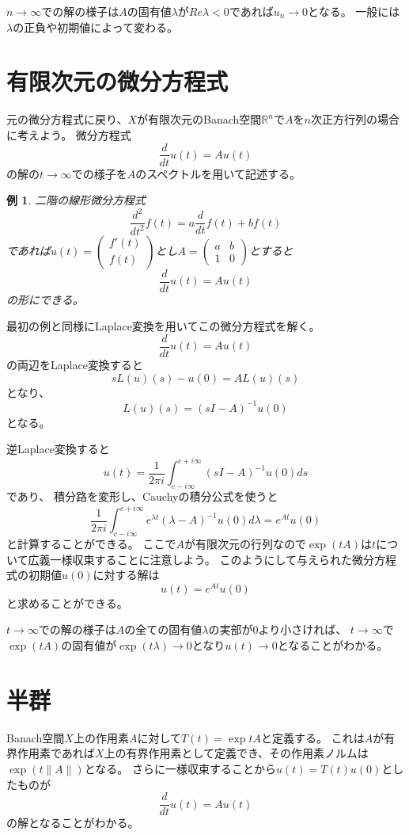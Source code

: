 \documentclass{jsarticle}
\newtheorem{eg}{例}
\newcommand{\R}{\mathbb{R}}
\newcommand{\norm}[1]{\|#1\|}
\begin{document}
$n\to\infty$での解の様子は$A$の固有値$\lambda$が$Re \lambda<0$であれば$u_n\to0$となる。
一般には$\lambda$の正負や初期値によって変わる。

\section{有限次元の微分方程式}
元の微分方程式に戻り、$X$が有限次元のBanach空間$\R^n$で$A$を$n$次正方行列の場合に考えよう。
微分方程式
\[
\frac{d}{dt}u(t)=Au(t)
\]
の解の$t\to\infty$での様子を$A$のスペクトルを用いて記述する。

\begin{eg}二階の線形微分方程式
\[
\frac{d^2}{dt^2}f(t)=a\frac{d}{dt}f(t)+bf(t)
\]
であれば$u(t)=\begin{pmatrix}f'(t)\\f(t)\end{pmatrix}$とし$A=\begin{pmatrix}a&b\\1&0\end{pmatrix}$とすると
\[
\frac{d}{dt}u(t)=Au(t)
\]
の形にできる。
\end{eg}

最初の例と同様にLaplace変換を用いてこの微分方程式を解く。
\[
\frac{d}{dt}u(t)=Au(t)
\]
の両辺をLaplace変換すると
\[
sL(u)(s)-u(0)=AL(u)(s)
\]
となり、
\[
L(u)(s)=(sI-A)^{-1}u(0)
\]
となる。

逆Laplace変換すると
\[
u(t)=\frac{1}{2\pi i}\int^{c+i\infty}_{c-i\infty}(sI-A)^{-1}u(0)ds
\]
であり、
積分路を変形し、Cauchyの積分公式を使うと
\[
\frac{1}{2\pi i}\int^{c+i\infty}_{c-i\infty}e^{\lambda t}(\lambda-A)^{-1}u(0)d\lambda=e^{At}u(0)
\]
と計算することができる。
ここで$A$が有限次元の行列なので$\exp(tA)$は$t$について広義一様収束することに注意しよう。
このようにして与えられた微分方程式の初期値$u(0)$に対する解は
\[
u(t)=e^{At}u(0)
\]
と求めることができる。

$t\to\infty$での解の様子は$A$の全ての固有値$\lambda$の実部が$0$より小さければ、
$t\to\infty$で$\exp(tA)$の固有値が$\exp(t\lambda)\to0$となり$u(t)\to0$となることがわかる。

\section{半群}
Banach空間$X$上の作用素$A$に対して$T(t)=\exp tA$と定義する。
これは$A$が有界作用素であれば$X$上の有界作用素として定義でき、その作用素ノルムは$\exp(t\norm{A})$となる。
さらに一様収束することから$u(t)=T(t)u(0)$としたものが
\[
\frac{d}{dt}u(t)=Au(t)
\]
の解となることがわかる。
\end{document}
